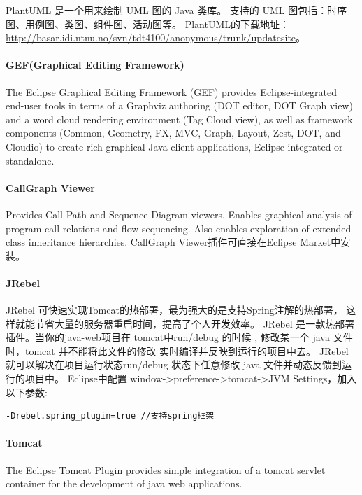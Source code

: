 \documentclass{book}
\begin{document}
PlantUML 是一个用来绘制 UML 图的 Java 类库。
支持的 UML 图包括：时序图、用例图、类图、组件图、活动图等。
PlantUML的下载地址：\url{http://basar.idi.ntnu.no/svn/tdt4100/anonymous/trunk/updatesite}。

\paragraph{GEF(Graphical Editing Framework)}

The Eclipse Graphical Editing Framework (GEF) provides 
Eclipse-integrated end-user tools in terms of a 
Graphviz authoring (DOT editor, DOT Graph view) 
and a word cloud rendering environment (Tag Cloud view), 
as well as framework components (Common, Geometry, 
FX, MVC, Graph, Layout, Zest, DOT, and Cloudio) to 
create rich graphical Java client applications, 
Eclipse-integrated or standalone.

\paragraph{CallGraph Viewer}

Provides Call-Path and Sequence Diagram viewers.
Enables graphical analysis of program call relations and flow sequencing. 
Also enables exploration of extended class inheritance hierarchies.
CallGraph Viewer插件可直接在Eclipse Market中安装。

\paragraph{JRebel}

JRebel 可快速实现Tomcat的热部署，最为强大的是支持Spring注解的热部署，
这样就能节省大量的服务器重启时间，提高了个人开发效率。
JRebel 是一款热部署插件。当你的java-web项目在 tomcat中run/debug 的时候 ,
修改某一个 java 文件时，tomcat 并不能将此文件的修改 实时编译并反映到运行的项目中去。
JRebel 就可以解决在项目运行状态run/debug 状态下任意修改 java 文件并动态反馈到运行的项目中。
Eclipse中配置 window->preference->tomcat->JVM Settings，加入以下参数:

\begin{lstlisting}[language=Bash]
-Drebel.spring_plugin=true //支持spring框架
\end{lstlisting}

\paragraph{Tomcat}

The Eclipse Tomcat Plugin provides simple integration of a tomcat servlet container for the development of java web applications.
\end{document}
